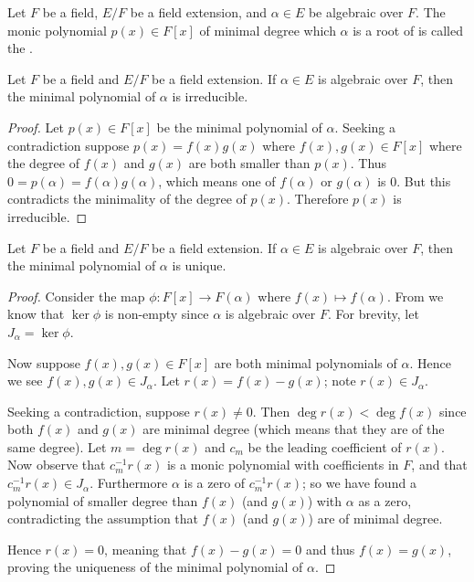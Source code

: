 \begin{definition}
    Let $F$ be a field, $E/F$ be a field extension, and $\alpha \in E$ be algebraic over $F$. The monic polynomial $p(x) \in F[x]$ of minimal degree which $\alpha$ is a root of is called the .
\end{definition}

\begin{corollary}\label{corollary-minimal-polynomial-is-irreducible}
    Let $F$ be a field and $E/F$ be a field extension. If $\alpha \in E$ is algebraic over $F$, then the minimal polynomial of $\alpha$ is irreducible.
\end{corollary}
\begin{proof}
    Let $p(x) \in F[x]$ be the minimal polynomial of $\alpha$. Seeking a contradiction suppose $p(x) = f(x)g(x)$ where $f(x), g(x) \in F[x]$ where the degree of $f(x)$ and $g(x)$ are both smaller than $p(x)$. Thus $0 = p(\alpha) = f(\alpha)g(\alpha)$, which means one of $f(\alpha)$ or $g(\alpha)$ is 0. But this contradicts the minimality of the degree of $p(x)$. Therefore $p(x)$ is irreducible.
\end{proof}

\begin{corollary}\label{corollary-minimal-polynomial-is-unique}
    Let $F$ be a field and $E/F$ be a field extension. If $\alpha \in E$ is algebraic over $F$, then the minimal polynomial of $\alpha$ is unique.
\end{corollary}
\begin{proof}
    Consider the map $\phi: F[x] \to F(\alpha)$ where $f(x) \mapsto f(\alpha)$. From  we know that $\ker\phi$ is non-empty since $\alpha$ is algebraic over $F$. For brevity, let $J_\alpha = \ker\phi$.

    Now suppose $f(x), g(x) \in F[x]$ are both minimal polynomials of $\alpha$. Hence we see $f(x), g(x) \in J_\alpha$. Let $r(x) = f(x) - g(x)$; note $r(x) \in J_\alpha$.

    Seeking a contradiction, suppose $r(x) \neq 0$. Then $\deg r(x) < \deg f(x)$ since both $f(x)$ and $g(x)$ are minimal degree (which means that they are of the same degree). Let $m = \deg r(x)$ and $c_m$ be the leading coefficient of $r(x)$. Now observe that $c_m^{-1}r(x)$ is a monic polynomial with coefficients in $F$, and that $c_m^{-1}r(x) \in J_\alpha$. Furthermore $\alpha$ is a zero of $c_m^{-1}r(x)$; so we have found a polynomial of smaller degree than $f(x)$ (and $g(x)$) with $\alpha$ as a zero, contradicting the assumption that $f(x)$ (and $g(x)$) are of minimal degree.

    Hence $r(x) = 0$, meaning that $f(x) - g(x) = 0$ and thus $f(x) = g(x)$, proving the uniqueness of the minimal polynomial of $\alpha$.
\end{proof}

